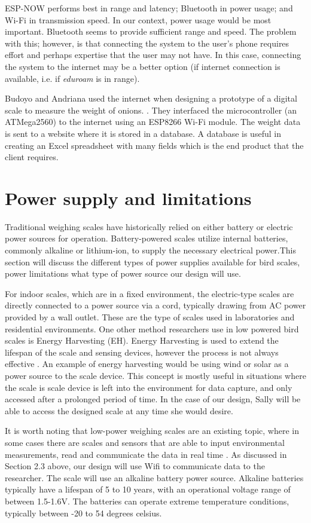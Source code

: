 \documentclass[class=report,11pt,crop=false]{standalone}
\begin{document}
ESP-NOW performs best in range and latency; Bluetooth in power usage; and Wi-Fi in transmission speed. In our context, power usage would be most important. Bluetooth seems to provide sufficient range and speed.
The problem with this; however, is that connecting the system to the user's phone requires effort and perhaps expertise that the user may not have. In this case, connecting the system to the internet may be a better option (if internet connection is available, i.e. if \textit{eduroam} is in range). 

Budoyo and Andriana used the internet when designing a prototype of a digital scale to measure the weight of onions. \cite{iot}. They interfaced the microcontroller (an  ATMega2560) to the internet using an ESP8266 Wi-Fi module. The weight data is sent to a website where it is stored in a database. A database is useful in creating an Excel spreadsheet with many fields which is the end product that the client requires.

\section{Power supply and limitations}	
Traditional weighing scales have historically relied on either battery or electric power sources for operation. Battery-powered scales utilize internal batteries, commonly alkaline or lithium-ion, to supply the necessary electrical power.This section will discuss the different types of power supplies available for bird scales, power limitations what type of power source our design will use.

For indoor scales, which are in a fixed environment, the electric-type scales are directly connected to a power source via a cord, typically drawing from AC power provided by a wall outlet. These are the type of scales used in laboratories and residential environments. One other method researchers use in low powered bird scales is Energy Harvesting (EH). Energy Harvesting is used to extend the lifespan of the scale and sensing devices, however the process is not always effective \cite{EnergyHarvesting}. An example of energy harvesting would be using wind or solar as a power source to the scale device. This concept is mostly useful in situations where the scale is scale device is left into the environment for data capture, and only accessed after a prolonged period of time. In the case of our design, Sally will be able to access the designed scale at any time she would desire.  

It is worth noting that low-power weighing scales are an existing topic, where in some cases there are scales and sensors that are able to input environmental measurements, read and communicate the data in real time \cite{ImageBased}. As discussed in Section 2.3 above, our design will use Wifi to communicate data to the researcher. The scale will use an alkaline battery power source. Alkaline batteries typically have a lifespan of 5 to 10 years, with an operational voltage range of between 1.5-1.6V. The batteries can operate extreme temperature conditions, typically between -20 to 54 degrees celsius.
\end{document}
